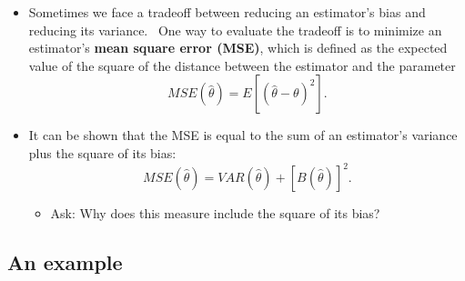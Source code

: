 \documentclass[11pt]{article}
\begin{document}
\begin{itemize}
\item Sometimes we face a tradeoff between reducing an estimator's bias and
reducing its variance. \ One way to evaluate the tradeoff is to minimize an
estimator's \textbf{mean square error (MSE)}, which is defined as the
expected value of the square of the distance between the estimator and the
parameter 
\begin{equation*}
MSE(\widehat{\theta })=E\left[ \left( \widehat{\theta }-\theta \right) ^{2}%
\right] .
\end{equation*}

\item It can be shown that the MSE is equal to the sum of an estimator's
variance plus the square of its bias:%
\begin{equation*}
MSE(\widehat{\theta })=VAR(\widehat{\theta })+\left[ B(\widehat{\theta })%
\right] ^{2}.
\end{equation*}

\begin{itemize}
\item Ask: Why does this measure include the square of its bias?
\end{itemize}
\end{itemize}

\subsection{An example}
\end{document}
